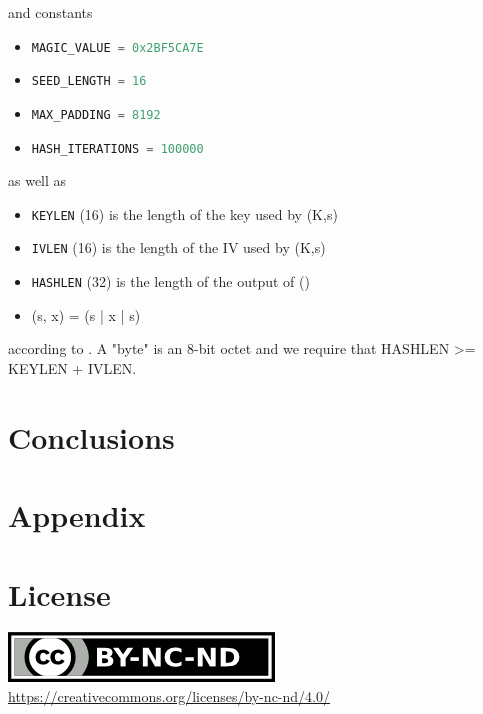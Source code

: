 \documentclass[sigconf, screen]{acmart}
\begin{document}
and constants
\begin{itemize}
    \item \lstinline[language=C]{MAGIC_VALUE = 0x2BF5CA7E}
    \item \lstinline[language=C]{SEED_LENGTH = 16}
    \item \lstinline[language=C]{MAX_PADDING = 8192}
    \item \lstinline[language=C]{HASH_ITERATIONS = 100000}
\end{itemize}

as well as
\begin{itemize}
    \item \lstinline[language=C]{KEYLEN} (16) is the length of the key used by \enc(K,s)
    \item \lstinline[language=C]{IVLEN} (16) is the length of the IV used by \enc(K,s)
    \item \lstinline[language=C]{HASHLEN} (32) is the length of the output of \hash()
    \item \mac(s, x) = \hash(s | x | s)
\end{itemize}

according to \cite{TorGitWebObfs2Specification}. A "byte" is an 8-bit octet and we require that HASHLEN >= KEYLEN + IVLEN.
\section{Conclusions}
\label{s:conclusions}
\appendix
\section{Appendix}
\label{s:appendix}


\section*{License}
\label{s:license}
\begin{center}
	\includegraphics{by-nc-nd.png} \\
	\url{https://creativecommons.org/licenses/by-nc-nd/4.0/}
\end{center}
\end{document}
